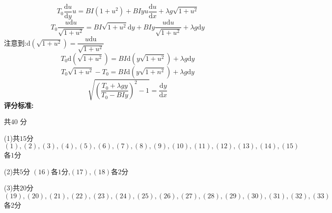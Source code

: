 \documentclass{article}
\begin{document}
\[
T_{0}\dfrac{\mathrm{d}u}{\mathrm{d}y}u=BI\left(1+u^{2}\right)+BIyu\dfrac{\mathrm{d}u}{\mathrm{d}x}+\lambda g\sqrt{1+u^{2}}
\tag{25}
\]
\[
T_{0}\dfrac{u\mathrm{d}u}{\sqrt{1+u^{2}}}=BI\sqrt{1+u^{2}}\mathrm{d}y+BIy\dfrac{u\mathrm{d}u}{\sqrt{1+u^{2}}}+\lambda g\mathrm{d}y
\tag{26}
\]
注意到:$\mathrm{d}\left( \sqrt{1+u^{2}}\right) =\dfrac{u\mathrm{du}}{\sqrt{1+u^{2}}}$
\[
    T_0\mathrm{d}\left( \sqrt{1+u^{2}}\right) =BI\mathrm{d}\left( y\sqrt{1+u^{2}}\right) +\lambda g\mathrm{d}y
\tag{27}
\]
\[
    T_{0}\sqrt{1+u^{2}}-T_{0}=BI\mathrm{d}\left( y\sqrt{1+n^{2}}\right) +\lambda g\mathrm{d}y
    \tag{28}
\]
\[
    \sqrt{\left( \dfrac{T_{0}+\lambda gy}{T_{0}-BIy}\right) ^{2}-1}=\dfrac{\mathrm{d}y}{\mathrm{d}x}
    \tag{29}
\]
\textbf{评分标准:}\par
共$40$ 分\par
(1)共$15$分 $(1),(2),(3),(4),(5),(6),(7),(8),(9),(10),(11),(12),(13),(14),(15)$各$1$分\par
(2)共$5$分 $(16)$各$1$分,$(17),(18)$各$2$分\par
(3)共$20$分 $(19),(20),(21),(22),(23),(24),(25),(26),(27),(28),(29),(30),(31),(32),(33)$各$2$分\par
\end{document}
